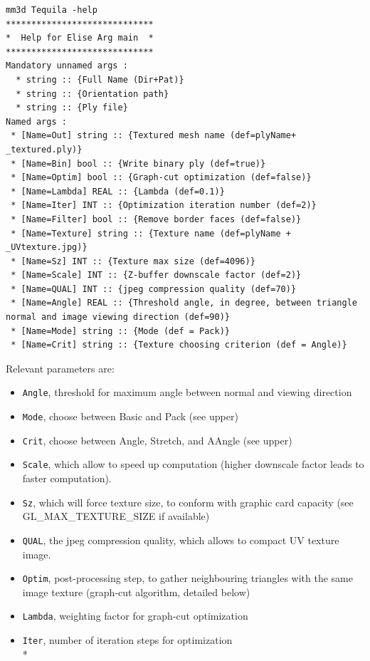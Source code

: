 \begin{verbatim}
mm3d Tequila -help
*****************************
*  Help for Elise Arg main  *
*****************************
Mandatory unnamed args :
  * string :: {Full Name (Dir+Pat)}
  * string :: {Orientation path}
  * string :: {Ply file}
Named args :
 * [Name=Out] string :: {Textured mesh name (def=plyName+ _textured.ply)}
 * [Name=Bin] bool :: {Write binary ply (def=true)}
 * [Name=Optim] bool :: {Graph-cut optimization (def=false)}
 * [Name=Lambda] REAL :: {Lambda (def=0.1)}
 * [Name=Iter] INT :: {Optimization iteration number (def=2)}
 * [Name=Filter] bool :: {Remove border faces (def=false)}
 * [Name=Texture] string :: {Texture name (def=plyName + _UVtexture.jpg)}
 * [Name=Sz] INT :: {Texture max size (def=4096)}
 * [Name=Scale] INT :: {Z-buffer downscale factor (def=2)}
 * [Name=QUAL] INT :: {jpeg compression quality (def=70)}
 * [Name=Angle] REAL :: {Threshold angle, in degree, between triangle normal and image viewing direction (def=90)}
 * [Name=Mode] string :: {Mode (def = Pack)}
 * [Name=Crit] string :: {Texture choosing criterion (def = Angle)}
\end{verbatim}

Relevant parameters are:
\begin{itemize}
\item {\tt Angle}, threshold for maximum angle between normal and viewing direction
\item {\tt Mode}, choose between Basic and Pack (see upper)
\item {\tt Crit}, choose between Angle, Stretch, and AAngle (see upper)
\item {\tt Scale}, which allow to speed up computation (higher downscale factor leads to faster computation).
\item {\tt Sz}, which will force texture size, to conform with graphic card capacity (see GL\_MAX\_TEXTURE\_SIZE if available)
\item {\tt QUAL}, the jpeg compression quality, which allows to compact UV texture image.
\item {\tt Optim}, post-processing step, to gather neighbouring triangles with the same image texture (graph-cut algorithm, detailed below)
\item {\tt Lambda}, weighting factor for graph-cut optimization
\item {\tt Iter}, number of iteration steps for optimization\\*
\end{itemize}

